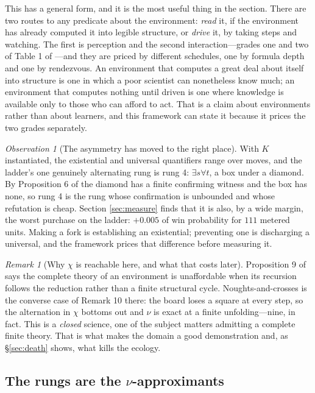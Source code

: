 \documentclass[11pt]{article}
\theoremstyle{definition}
\theoremstyle{plain}
\theoremstyle{remark}
\newtheorem{remark}[definition]{Remark}
\newtheorem{observation}[definition]{Observation}
\begin{document}
This has a general form, and it is the most useful thing in the section. There
are two routes to any predicate about the environment: \emph{read} it, if the
environment has already computed it into legible structure, or \emph{drive} it,
by taking steps and watching. The first is perception and the second
interaction---grades one and two of Table 1 of \cite{scientist}---and they are
priced by different schedules, one by formula depth and one by rendezvous. An
environment that computes a great deal about itself into structure is one in
which a poor scientist can nonetheless know much; an environment that computes
nothing until driven is one where knowledge is available only to those who can
afford to act. That is a claim about environments rather than about learners,
and this framework can state it because it prices the two grades separately.

\begin{observation}[The asymmetry has moved to the right place]\label{obs:asym}
With $K$ instantiated, the existential and universal quantifiers range over
moves, and the ladder's one genuinely alternating rung is rung 4:
$\exists s \forall t$, a box under a diamond. By Proposition 6 of
\cite{scientist} the diamond has a finite confirming witness and the box has
none, so rung 4 is the rung whose confirmation is unbounded and whose refutation
is cheap. Section \ref{sec:measure} finds that it is also, by a wide margin, the
worst purchase on the ladder: $+0.005$ of win probability for $111$ metered
units. Making a fork is establishing an existential; preventing one is
discharging a universal, and the framework prices that difference before
measuring it.
\end{observation}

\begin{remark}[Why $\chi$ is reachable here, and what that costs later]
Proposition 9 of \cite{scientist} says the complete theory of an environment is
unaffordable when its recursion follows the reduction rather than a finite
structural cycle. Noughts-and-crosses is the converse case of Remark 10 there:
the board loses a square at every step, so the alternation in $\chi$ bottoms out
and $\nu$ is exact at a finite unfolding---nine, in fact. This is a \emph{closed}
science, one of the subject matters admitting a complete finite theory. That is
what makes the domain a good demonstration and, as \S\ref{sec:death} shows, what
kills the ecology.
\end{remark}

\subsection{The rungs are the $\nu$-approximants}
\end{document}
